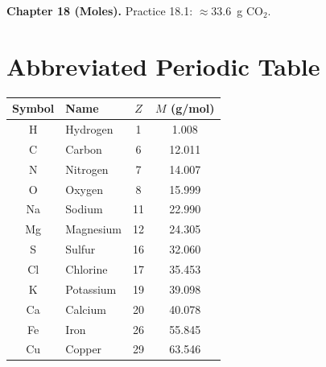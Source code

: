 \documentclass[11pt, openany]{book}
\theoremstyle{plain}
\theoremstyle{definition}
\theoremstyle{remark}
\begin{document}
\textbf{Chapter 18 (Moles).}
Practice 18.1: $\approx33.6$~g CO$_2$.

\chapter*{Abbreviated Periodic Table}

\begin{center}
\renewcommand{\arraystretch}{1.45}
\begin{tabular}{clcc}
\toprule
\textbf{Symbol} & \textbf{Name} & \textbf{$Z$} & \textbf{$M$ (g/mol)} \\
\midrule
H  & Hydrogen  & 1  & 1.008  \\
C  & Carbon    & 6  & 12.011 \\
N  & Nitrogen  & 7  & 14.007 \\
O  & Oxygen    & 8  & 15.999 \\
Na & Sodium    & 11 & 22.990 \\
Mg & Magnesium & 12 & 24.305 \\
S  & Sulfur    & 16 & 32.060 \\
Cl & Chlorine  & 17 & 35.453 \\
K  & Potassium & 19 & 39.098 \\
Ca & Calcium   & 20 & 40.078 \\
Fe & Iron      & 26 & 55.845 \\
Cu & Copper    & 29 & 63.546 \\
\bottomrule
\end{tabular}
\end{center}



\end{document}
